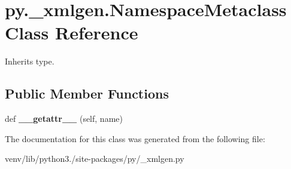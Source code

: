 \hypertarget{classpy_1_1__xmlgen_1_1_namespace_metaclass}{}\section{py.\+\_\+xmlgen.\+Namespace\+Metaclass Class Reference}
\label{classpy_1_1__xmlgen_1_1_namespace_metaclass}


Inherits type.

\subsection*{Public Member Functions}
\begin{DoxyCompactItemize}
\item 
\mbox{\label{classpy_1_1__xmlgen_1_1_namespace_metaclass_ade7fb7124c97bef117f1113b2ded2489}} 
def {\bfseries \+\_\+\+\_\+getattr\+\_\+\+\_\+} (self, name)
\end{DoxyCompactItemize}


The documentation for this class was generated from the following file\+:\begin{DoxyCompactItemize}
\item 
venv/lib/python3./site-\/packages/py/\+\_\+xmlgen.\+py\end{DoxyCompactItemize}
